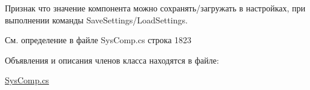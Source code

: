 Признак что значение компонента можно сохранять/загружать в настройках, при выполнении команды Save\+Settings/\+Load\+Settings. ~\newline




См. определение в файле Sys\+Comp.\+cs строка 1823



Объявления и описания членов класса находятся в файле\+:\begin{DoxyCompactItemize}
\item 
\mbox{\hyperlink{_sys_comp_8cs}{Sys\+Comp.\+cs}}\end{DoxyCompactItemize}
